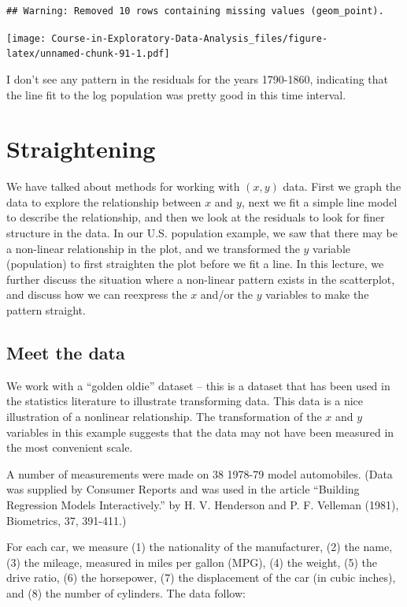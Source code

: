 \documentclass[
]{book}
\begin{document}
\begin{verbatim}
## Warning: Removed 10 rows containing missing values (geom_point).
\end{verbatim}

\texttt{[image: Course-in-Exploratory-Data-Analysis\_files/figure-latex/unnamed-chunk-91-1.pdf]}

I don't see any pattern in the residuals for the years 1790-1860, indicating that the line fit to the log population was pretty good in this time interval.

\hypertarget{straightening}{%
\chapter{Straightening}\label{straightening}}

We have talked about methods for working with \((x, y)\) data. First we graph the data to explore the relationship between \(x\) and \(y\), next we fit a simple line model to describe the relationship, and then we look at the residuals to look for finer structure in the data. In our U.S. population example, we saw that there may be a non-linear relationship in the plot, and we transformed the \(y\) variable (population) to first straighten the plot before we fit a line. In this lecture, we further discuss the situation where a non-linear pattern exists in the scatterplot, and discuss how we can reexpress the \(x\) and/or the \(y\) variables to make the pattern straight.

\hypertarget{meet-the-data-4}{%
\section{Meet the data}\label{meet-the-data-4}}

We work with a ``golden oldie'' dataset -- this is a dataset that has been used in the statistics literature to illustrate transforming data. This data is a nice illustration of a nonlinear relationship. The transformation of the \(x\) and \(y\) variables in this example suggests that the data may not have been measured in the most convenient scale.

A number of measurements were made on 38 1978-79 model automobiles. (Data was supplied by Consumer Reports and was used in the article ``Building Regression Models Interactively.'' by H. V. Henderson and P. F. Velleman (1981), Biometrics, 37, 391-411.)

For each car, we measure (1) the nationality of the manufacturer, (2) the name, (3) the mileage, measured in miles per gallon (MPG), (4) the weight, (5) the drive ratio, (6) the horsepower, (7) the displacement of the car (in cubic inches), and (8) the number of cylinders. The data follow:
\end{document}

